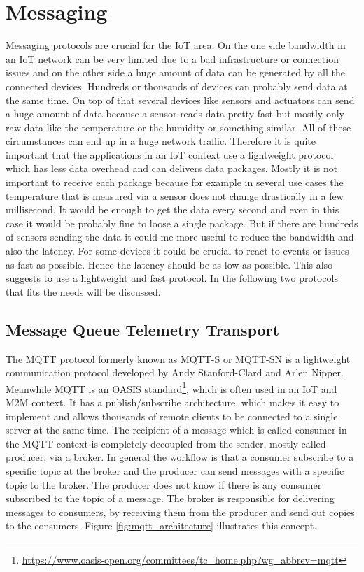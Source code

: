 \section{Messaging}
Messaging protocols are crucial for the \ac{IoT} area.
On the one side bandwidth in an \ac{IoT} network can be very limited due to a bad infrastructure or connection issues and on the other side a huge amount of data can be generated by all the connected devices.
Hundreds or thousands of devices can probably send data at the same time.
On top of that several devices like sensors and actuators can send a huge amount of data because a sensor reads data pretty fast but mostly only raw data like the temperature or the humidity or something similar.
All of these circumstances can end up in a huge network traffic.
Therefore it is quite important that the applications in an \ac{IoT} context use a lightweight protocol which has less data overhead and can delivers data packages.
Mostly it is not important to receive each package because for example in several use cases the temperature that is measured via a sensor does not change drastically in a few millisecond.
It would be enough to get the data every second and even in this case it would be probably fine to loose a single package.
But if there are hundreds of sensors sending the data it could me more useful to reduce the bandwidth and also the latency.
For some devices it could be crucial to react to events or issues as fast as possible.
Hence the latency should be as low as possible.
This also suggests to use a lightweight and fast protocol.
In the following two protocols that fits the needs will be discussed.

\subsection{Message Queue Telemetry Transport}
\label{section:MQTT}
The \ac{MQTT} protocol formerly known as MQTT-S or MQTT-SN is a lightweight communication protocol developed by Andy Stanford-Clard and Arlen Nipper.\autocite[cf.]{MQTT:FAQ}
Meanwhile \ac{MQTT} is an \ac{OASIS} standard\footnote{\url{https://www.oasis-open.org/committees/tc_home.php?wg_abbrev=mqtt}}, which is often used in an \ac{IoT} and \ac{M2M} context.\autocite[cf.][p. 5]{lampkin:2012:mqtt}
It has a publish/subscribe architecture, which makes it easy to implement and allows thousands of remote clients to be connected to a single server at the same time.\autocite[cf.][p. 5]{lampkin:2012:mqtt}
The recipient of a message which is called consumer in the \ac{MQTT} context is completely decoupled from the sender, mostly called producer, via a broker.
In general the workflow is that a consumer subscribe to a specific topic at the broker and the producer can send messages with a specific topic to the broker.
The producer does not know if there is any consumer subscribed to the topic of a message.
The broker is responsible for delivering messages to consumers, by receiving them from the producer and send out copies to the consumers.
Figure \ref{fig:mqtt_architecture} illustrates this concept.

